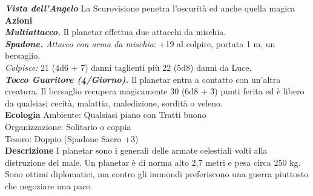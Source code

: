 \begin{multicols}{2}
\emph{\textbf{Vista dell'Angelo}} La Scurovisione penetra l'oscurità ed anche quella magica\\
\smallskip\textbf{Azioni}\\
\emph{\textbf{Multiattacco.}} Il planetar effettua due attacchi da mischia.\\
\emph{\textbf{Spadone.} Attacco con arma da mischia}: +19 al colpire, portata 1 m, un bersaglio.\\
\emph{Colpisce:} 21 (4d6 + 7) danni taglienti più 22 (5d8) danni da Luce.\\
\emph{\textbf{Tocco Guaritore (4/Giorno).}} Il planetar entra a contatto con un'altra creatura. Il bersaglio recupera magicamente 30 (6d8 + 3) punti ferita ed è libero da qualsiasi cecità, malattia, maledizione, sordità o veleno.\\
\textbf{Ecologia}
Ambiente: Qualsiasi piano con Tratti buono\\
Organizzazione: Solitario o coppia\\
Tesoro: Doppio (Spadone Sacro +3)\\
\textbf{Descrizione}
I planetar sono i generali delle armate celestiali volti alla distruzione del male. Un planetar è di norma alto 2,7 metri e pesa circa 250 kg. Sono ottimi diplomatici, ma contro gli immondi preferiscono una guerra piuttosto che negoziare una pace.\\


\end{multicols}
